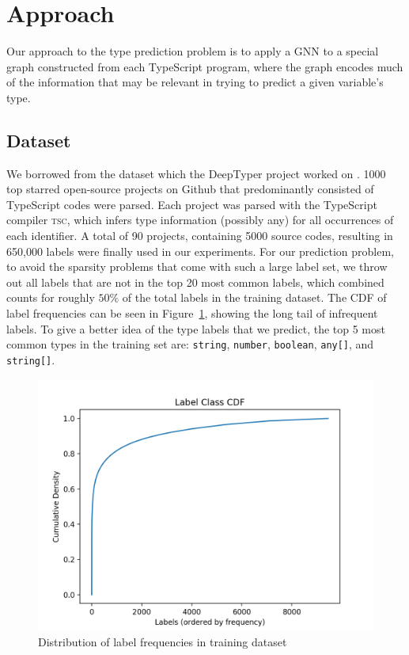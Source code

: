 \section{Approach}
\label{sec:approach}

Our approach to the type prediction problem is to apply a GNN to a special graph constructed from each TypeScript program, where the graph encodes much of the information that may be relevant in trying to predict a given variable's type.

\subsection{Dataset}
\label{sec:dataset}
We borrowed from the dataset which the DeepTyper project worked on \cite{hellendoorn2018deep}. 1000 top starred open-source projects on Github that predominantly consisted of TypeScript codes were parsed. Each project was parsed with the TypeScript compiler \textsc{tsc}, which infers type information (possibly any) for all occurrences of each identifier. A total of 90 projects, containing 5000 source codes, resulting in 650,000 labels were finally used in our experiments.
For our prediction problem, to avoid the sparsity problems that come with such a large label set, we throw out all labels that are not in the top 20 most common labels, which combined counts for roughly $50\%$ of the total labels in the training dataset.
The CDF of label frequencies can be seen in Figure~\ref{fig:lab-cdf}, showing the long tail of infrequent labels.
To give a better idea of the type labels that we predict, the top 5 most common types in the training set are: \texttt{string}, \texttt{number}, \texttt{boolean}, \texttt{any[]}, and \texttt{string[]}.

\begin{figure}
  \centering
  \includegraphics[width=\linewidth]{img/label_cdf}
  \caption{Distribution of label frequencies in training dataset}
  \label{fig:lab-cdf}
\end{figure}

